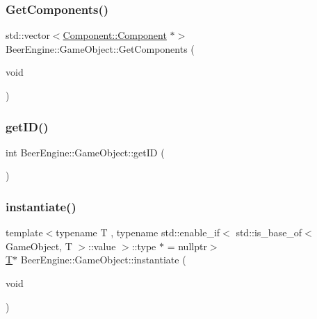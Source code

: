 \mbox{\label{class_beer_engine_1_1_game_object_a090858d4edf1420427cd329688bc2e7c}} 
\subsubsection{\texorpdfstring{Get\+Components()}{GetComponents()}\hspace{0.1cm}{\footnotesize\ttfamily [2/2]}}
{\footnotesize\ttfamily std\+::vector$<$\mbox{\hyperlink{class_beer_engine_1_1_component_1_1_component}{Component\+::\+Component}} $\ast$$>$ Beer\+Engine\+::\+Game\+Object\+::\+Get\+Components (\begin{DoxyParamCaption}\item[{void}]{ }\end{DoxyParamCaption})}

\mbox{\label{class_beer_engine_1_1_game_object_a36782b2d17c0e576ab740903c5cfeab0}} 
\subsubsection{\texorpdfstring{get\+I\+D()}{getID()}}
{\footnotesize\ttfamily int Beer\+Engine\+::\+Game\+Object\+::get\+ID (\begin{DoxyParamCaption}{ }\end{DoxyParamCaption})}

\mbox{\label{class_beer_engine_1_1_game_object_ab88b7ff5e8aab52e54c02f9d103bbfcf}} 
\subsubsection{\texorpdfstring{instantiate()}{instantiate()}\hspace{0.1cm}{\footnotesize\ttfamily [1/2]}}
{\footnotesize\ttfamily template$<$typename T , typename std\+::enable\+\_\+if$<$ std\+::is\+\_\+base\+\_\+of$<$ Game\+Object, T $>$\+::value $>$\+::type $\ast$  = nullptr$>$ \\
\mbox{\hyperlink{namespace_beer_engine_a94f0b552f6dc910de8cdb44207981f53a8de48e594408f9fc561b2f68ce05f664}{T}}$\ast$ Beer\+Engine\+::\+Game\+Object\+::instantiate (\begin{DoxyParamCaption}\item[{void}]{ }\end{DoxyParamCaption})\hspace{0.3cm}{\ttfamily [inline]}}

